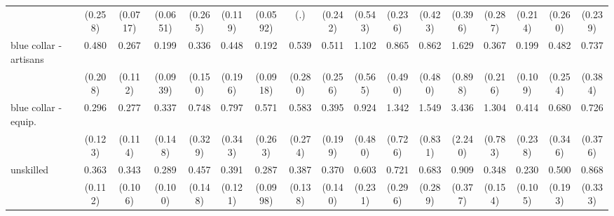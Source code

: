 {\begin{tabular}{l*{16}{c}}
                    &     (0.258)         &    (0.0717)         &    (0.0651)         &     (0.265)         &     (0.119)         &    (0.0592)         &         (.)         &     (0.242)         &     (0.543)         &     (0.236)         &     (0.423)         &     (0.396)         &     (0.287)         &     (0.214)         &     (0.260)         &     (0.239)         \\
[1em]
blue collar - artisans&       0.480         &       0.267\sym{**} &       0.199\sym{***}&       0.336\sym{*}  &       0.448         &       0.192\sym{***}&       0.539         &       0.511         &       1.102         &       0.865         &       0.862         &       1.629         &       0.367         &       0.199\sym{**} &       0.482         &       0.737         \\
                    &     (0.208)         &     (0.112)         &    (0.0939)         &     (0.150)         &     (0.196)         &    (0.0918)         &     (0.280)         &     (0.256)         &     (0.565)         &     (0.490)         &     (0.480)         &     (0.898)         &     (0.216)         &     (0.109)         &     (0.254)         &     (0.384)         \\
[1em]
blue collar - equip.&       0.296\sym{**} &       0.277\sym{**} &       0.337\sym{*}  &       0.748         &       0.797         &       0.571         &       0.583         &       0.395         &       0.924         &       1.342         &       1.549         &       3.436         &       1.304         &       0.414         &       0.680         &       0.726         \\
                    &     (0.123)         &     (0.114)         &     (0.148)         &     (0.329)         &     (0.343)         &     (0.263)         &     (0.274)         &     (0.199)         &     (0.480)         &     (0.726)         &     (0.831)         &     (2.240)         &     (0.783)         &     (0.238)         &     (0.346)         &     (0.376)         \\
[1em]
unskilled           &       0.363\sym{**} &       0.343\sym{***}&       0.289\sym{***}&       0.457\sym{*}  &       0.391\sym{**} &       0.287\sym{***}&       0.387\sym{**} &       0.370\sym{**} &       0.603         &       0.721         &       0.683         &       0.909         &       0.348\sym{*}  &       0.230\sym{**} &       0.500         &       0.868         \\
                    &     (0.112)         &     (0.106)         &     (0.100)         &     (0.148)         &     (0.121)         &    (0.0998)         &     (0.138)         &     (0.140)         &     (0.231)         &     (0.296)         &     (0.289)         &     (0.377)         &     (0.154)         &     (0.105)         &     (0.193)         &     (0.333)         \\

\end{tabular}}
